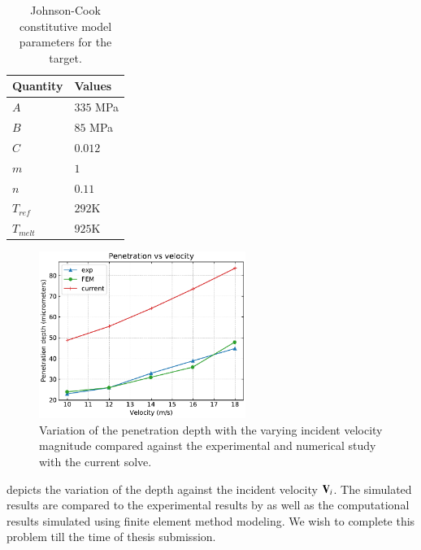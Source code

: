 \begin{table}[!ht]
  \centering
  \begin{tabular}[!ht]{ll}
    \toprule
    Quantity & Values\\
    \midrule
    $A$ & $335$ MPa \\
    $B$ & $85$ MPa \\
    $C$ & $0.012$ \\
    $m$ & $1$ \\
    $n$ & $0.11$ \\
    $T_{ref}$ & $292$K \\
    $T_{melt}$ & $925$K \\
    \bottomrule
  \end{tabular}
  \caption{Johnson-Cook constitutive model parameters for the target.}%
  \label{tab:sphere-target-impact-Johnson}
\end{table}
\begin{figure}[!htpb]
  \centering
  \includegraphics[width=0.6\textwidth]{figures/erosion/figures/cao_xuerui_2022_spherical_particle_impact_3d/penetration_vs_velocity}
  \caption{Variation of the penetration depth with the varying incident velocity
    magnitude compared against the experimental and numerical study with the
    current solve.}
  \label{fig:results-sphere-target-impact-vel-vs-depth}
\end{figure}
 depicts the variation of
the depth against the incident velocity $\mathbf{V}_i$. The simulated results are
compared to the experimental results by \cite{zang2022investigation} as well as
the computational results simulated using finite element method modeling. We
wish to complete this problem till the time of thesis submission.
